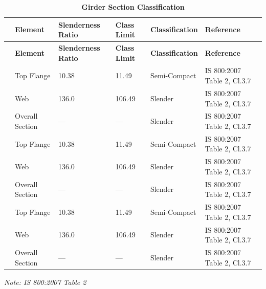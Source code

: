 \documentclass[12pt,a4paper]{report}
\numberwithin{table}{chapter}
\numberwithin{figure}{chapter}
\begin{document}
\vspace{1em}
\begin{longtable}{|C{2.2cm}|L{2.6cm}|C{3.0cm}|C{2.2cm}|>{\centering\arraybackslash}p{3.2cm}|C{2.3cm}|}
\caption{\textbf{Girder Section Classification}}
\hline
\textbf{} & \textbf{Element} & \textbf{Slenderness Ratio} & \textbf{Class Limit} & \textbf{Classification} & \textbf{Reference} \\[6pt]
\hline
\endfirsthead

\hline
\textbf{} & \textbf{Element} & \textbf{Slenderness Ratio} & \textbf{Class Limit} & \textbf{Classification} & \textbf{Reference} \\[6pt]
\hline
\endhead
{} & Top Flange & 10.38 & 11.49 & Semi-Compact & IS 800:2007 Table 2, Cl.3.7 \\[6pt]
 & Web & 136.0 & 106.49 & Slender & IS 800:2007 Table 2, Cl.3.7 \\[6pt]
 & Overall Section & --- & --- & Slender & IS 800:2007 Table 2, Cl.3.7 \\[6pt]
\hline
{} & Top Flange & 10.38 & 11.49 & Semi-Compact & IS 800:2007 Table 2, Cl.3.7 \\[6pt]
 & Web & 136.0 & 106.49 & Slender & IS 800:2007 Table 2, Cl.3.7 \\[6pt]
 & Overall Section & --- & --- & Slender & IS 800:2007 Table 2, Cl.3.7 \\[6pt]
\hline
{} & Top Flange & 10.38 & 11.49 & Semi-Compact & IS 800:2007 Table 2, Cl.3.7 \\[6pt]
 & Web & 136.0 & 106.49 & Slender & IS 800:2007 Table 2, Cl.3.7 \\[6pt]
 & Overall Section & --- & --- & Slender & IS 800:2007 Table 2, Cl.3.7 \\[6pt]
\hline
\end{longtable}
\noindent\textit{Note: IS 800:2007 Table 2}
\end{document}
